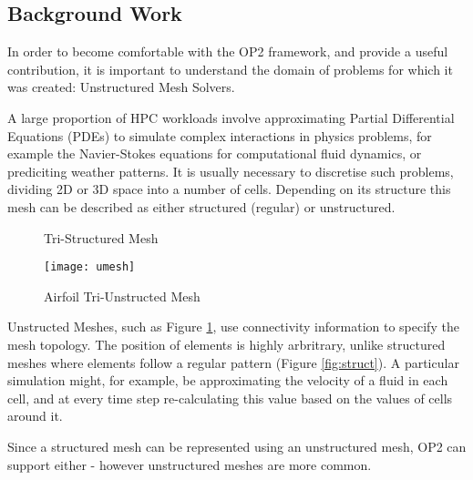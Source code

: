 \subsection{Background Work}
\label{sec:bgwork}

In order to become comfortable with the OP2 framework, and provide a useful contribution, it is important to understand the domain of problems for which it was created: Unstructured Mesh Solvers.
\par
A large proportion of HPC workloads involve approximating Partial Differential Equations (PDEs) to simulate complex interactions in physics problems, for example the Navier-Stokes equations for computational fluid dynamics, or prediciting weather patterns. It is usually necessary to discretise such problems, dividing 2D or 3D space into a number of cells. Depending on its structure this mesh can be described as either structured (regular) or unstructured.

\begin{figure}[h!]
  \begin{minipage}{.5\textwidth}
    \centering
    \caption{Tri-Structured Mesh}
    \label{fig:struct}
  \end{minipage}
  \begin{minipage}{.5\textwidth}
    \centering
    \texttt{[image: umesh]}
    \caption{Airfoil Tri-Unstructed Mesh}
    \label{fig:umesh}
  \end{minipage}
\end{figure}
Unstructed Meshes, such as Figure \ref{fig:umesh}, use connectivity information to specify the mesh topology. The position of elements is highly arbritrary, unlike structured meshes where elements follow a regular pattern (Figure \ref{fig:struct}). A particular simulation might, for example, be approximating the velocity of a fluid in each cell, and at every time step re-calculating this value based on the values of cells around it.
\par
Since a structured mesh can be represented using an unstructured mesh, OP2 can support either - however unstructured meshes are more common.


